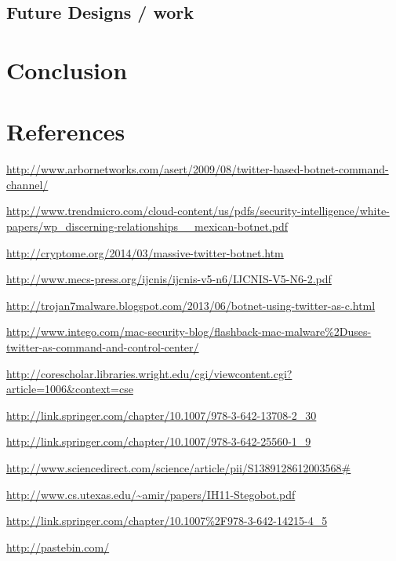 \documentclass[11pt, oneside]{article} %
\numberwithin{equation}{section} %
\numberwithin{figure}{section} %
\numberwithin{table}{section} %
\begin{document}
	\subsection{Future Designs / work}

\section{Conclusion}


\clearpage
\section{References}

\begingroup
\renewcommand{\section}[2]{}%
\begin{thebibliography}{99}

	\url{http://www.arbornetworks.com/asert/2009/08/twitter-based-botnet-command-channel/}

	\url{http://www.trendmicro.com/cloud-content/us/pdfs/security-intelligence/white-papers/wp_discerning-relationships__mexican-botnet.pdf}

	\url{http://cryptome.org/2014/03/massive-twitter-botnet.htm}

	\url{http://www.mecs-press.org/ijcnis/ijcnis-v5-n6/IJCNIS-V5-N6-2.pdf}

	\url{http://trojan7malware.blogspot.com/2013/06/botnet-using-twitter-as-c.html}

	\url{http://www.intego.com/mac-security-blog/flashback-mac-malware\%2Duses-twitter-as-command-and-control-center/}

	\url{http://corescholar.libraries.wright.edu/cgi/viewcontent.cgi?article=1006&context=cse}

	\url{http://link.springer.com/chapter/10.1007/978-3-642-13708-2_30}

	\url{http://link.springer.com/chapter/10.1007/978-3-642-25560-1_9}

	\url{http://www.sciencedirect.com/science/article/pii/S1389128612003568#}

	\url{http://www.cs.utexas.edu/~amir/papers/IH11-Stegobot.pdf}

	\url{http://link.springer.com/chapter/10.1007\%2F978-3-642-14215-4_5}

	\url{http://pastebin.com/}

\end{thebibliography}

\endgroup
\end{document}
